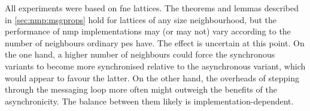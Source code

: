 All experiments were based on \gls{fne} lattices.  The theorems and lemmas described in \cref{sec:nmp:msgprops} hold for lattices of any size neighbourhood, but the performance of \gls{nmp} implementations may (or may not) vary according to the number of neighbours ordinary \glspl{pe} have.  The effect is uncertain at this point.  On the one hand, a higher number of neighbours could force the synchronous variants to become more synchronised relative to the asynchronous variant, which would appear to favour the latter.  On the other hand, the overheads of stepping through the messaging loop more often might outweigh the benefits of the asynchronicity.  The balance between them likely is implementation-dependent.